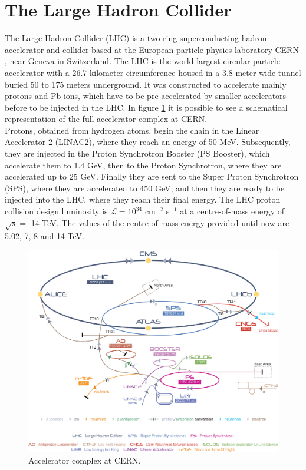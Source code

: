 \documentclass[b5paper,10pt,twoside,oldstyle,classica]{toptesi}
\begin{document}
\section{The Large Hadron Collider}
The Large Hadron Collider (LHC) is a two-ring superconducting hadron accelerator and collider based at the European particle physics laboratory CERN \cite{Evans:2008zzb}, near Geneva in Switzerland. The LHC is the world largest circular particle accelerator with a 26.7 kilometer circumference housed in a 3.8-meter-wide tunnel buried 50 to 175 meters underground.
It was constructed to accelerate mainly protons and Pb ions, which have to be pre-accelerated by smaller accelerators before to be injected in the LHC. In figure \ref{accelerators} it is possible to see a schematical representation of the full accelerator complex at CERN. \\Protons, obtained from hydrogen atoms, begin the chain in the Linear Accelerator 2 (LINAC2), where they reach an energy of 50 MeV. Subsequently, they are injected in the Proton Synchrotron Booster (PS Booster), which accelerate them to 1.4 GeV, then to the Proton Synchrotron, where they are accelerated up to 25 GeV. Finally they are sent to the Super Proton Synchrotron
(SPS), where they are accelerated to 450 GeV, and then they are ready to be injected into the LHC, where they reach their final energy.
The LHC proton collision design luminosity is $\mathcal{L} = 10^{34}$ cm$^{-2}$ s$^{-1}$ at a centre-of-mass energy of $\sqrt{s} =$ 14 TeV. The values of the centre-of-mass energy provided until now are 5.02, 7, 8 and 14 TeV. 
\begin{figure}[tb]
\begin{center}
\includegraphics[scale = 0.3]{accelerators.jpg}
\caption{Accelerator complex at CERN.}
\label{accelerators}
\end{center}
\end{figure}
\end{document}
